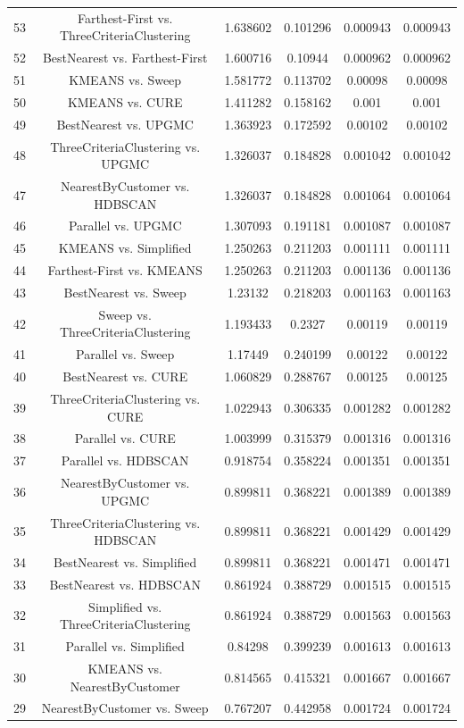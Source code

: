 \documentclass[a4paper,10pt]{article}
\begin{document}
\begin{landscape}
\begin{table}[!htp]
\begin{tabular}{cccccc}
53&Farthest-First vs. ThreeCriteriaClustering&1.638602&0.101296&0.000943&0.000943\\
52&BestNearest vs. Farthest-First&1.600716&0.10944&0.000962&0.000962\\
51&KMEANS vs. Sweep&1.581772&0.113702&0.00098&0.00098\\
50&KMEANS vs. CURE&1.411282&0.158162&0.001&0.001\\
49&BestNearest vs. UPGMC&1.363923&0.172592&0.00102&0.00102\\
48&ThreeCriteriaClustering vs. UPGMC&1.326037&0.184828&0.001042&0.001042\\
47&NearestByCustomer vs. HDBSCAN&1.326037&0.184828&0.001064&0.001064\\
46&Parallel vs. UPGMC&1.307093&0.191181&0.001087&0.001087\\
45&KMEANS vs. Simplified&1.250263&0.211203&0.001111&0.001111\\
44&Farthest-First vs. KMEANS&1.250263&0.211203&0.001136&0.001136\\
43&BestNearest vs. Sweep&1.23132&0.218203&0.001163&0.001163\\
42&Sweep vs. ThreeCriteriaClustering&1.193433&0.2327&0.00119&0.00119\\
41&Parallel vs. Sweep&1.17449&0.240199&0.00122&0.00122\\
40&BestNearest vs. CURE&1.060829&0.288767&0.00125&0.00125\\
39&ThreeCriteriaClustering vs. CURE&1.022943&0.306335&0.001282&0.001282\\
38&Parallel vs. CURE&1.003999&0.315379&0.001316&0.001316\\
37&Parallel vs. HDBSCAN&0.918754&0.358224&0.001351&0.001351\\
36&NearestByCustomer vs. UPGMC&0.899811&0.368221&0.001389&0.001389\\
35&ThreeCriteriaClustering vs. HDBSCAN&0.899811&0.368221&0.001429&0.001429\\
34&BestNearest vs. Simplified&0.899811&0.368221&0.001471&0.001471\\
33&BestNearest vs. HDBSCAN&0.861924&0.388729&0.001515&0.001515\\
32&Simplified vs. ThreeCriteriaClustering&0.861924&0.388729&0.001563&0.001563\\
31&Parallel vs. Simplified&0.84298&0.399239&0.001613&0.001613\\
30&KMEANS vs. NearestByCustomer&0.814565&0.415321&0.001667&0.001667\\
29&NearestByCustomer vs. Sweep&0.767207&0.442958&0.001724&0.001724\\

\end{tabular}
\end{table}
\end{landscape}
\end{document}
